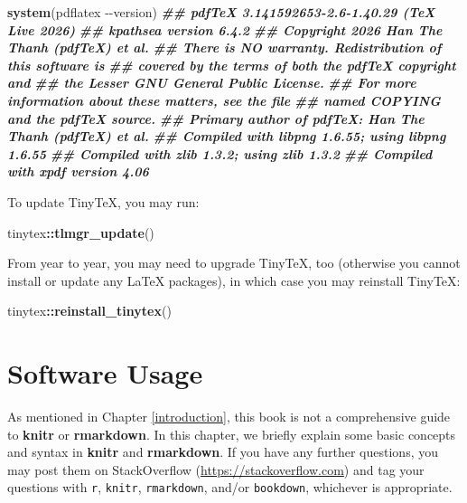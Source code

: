 \documentclass[
  12pt,
]{krantz}
\newenvironment{Shaded}{\begin{snugshade}}{\end{snugshade}}
\newcommand{\DocumentationTok}[1]{\textcolor[rgb]{0.56,0.35,0.01}{\textbf{\textit{#1}}}}
\newcommand{\FunctionTok}[1]{\textcolor[rgb]{0.13,0.29,0.53}{\textbf{#1}}}
\newcommand{\NormalTok}[1]{#1}
\newcommand{\SpecialCharTok}[1]{\textcolor[rgb]{0.81,0.36,0.00}{\textbf{#1}}}
\newcommand{\StringTok}[1]{\textcolor[rgb]{0.31,0.60,0.02}{#1}}
\theoremstyle{definition}
\theoremstyle{definition}
\theoremstyle{definition}
\theoremstyle{definition}
\theoremstyle{remark}
\begin{document}
\begin{Shaded}
\begin{Highlighting}[]
\FunctionTok{system}\NormalTok{(}\StringTok{\textquotesingle{}pdflatex {-}{-}version\textquotesingle{}}\NormalTok{)}
\DocumentationTok{\#\#  pdfTeX 3.141592653{-}2.6{-}1.40.29 (TeX Live 2026)}
\DocumentationTok{\#\#  kpathsea version 6.4.2}
\DocumentationTok{\#\#  Copyright 2026 Han The Thanh (pdfTeX) et al.}
\DocumentationTok{\#\#  There is NO warranty.  Redistribution of this software is}
\DocumentationTok{\#\#  covered by the terms of both the pdfTeX copyright and}
\DocumentationTok{\#\#  the Lesser GNU General Public License.}
\DocumentationTok{\#\#  For more information about these matters, see the file}
\DocumentationTok{\#\#  named COPYING and the pdfTeX source.}
\DocumentationTok{\#\#  Primary author of pdfTeX: Han The Thanh (pdfTeX) et al.}
\DocumentationTok{\#\#  Compiled with libpng 1.6.55; using libpng 1.6.55}
\DocumentationTok{\#\#  Compiled with zlib 1.3.2; using zlib 1.3.2}
\DocumentationTok{\#\#  Compiled with xpdf version 4.06}
\end{Highlighting}
\end{Shaded}

To update TinyTeX, you may run:

\begin{Shaded}
\begin{Highlighting}[]
\NormalTok{tinytex}\SpecialCharTok{::}\FunctionTok{tlmgr\_update}\NormalTok{()}
\end{Highlighting}
\end{Shaded}

From year to year, you may need to upgrade TinyTeX, too (otherwise you cannot install or update any LaTeX packages), in which case you may reinstall TinyTeX:

\begin{Shaded}
\begin{Highlighting}[]
\NormalTok{tinytex}\SpecialCharTok{::}\FunctionTok{reinstall\_tinytex}\NormalTok{()}
\end{Highlighting}
\end{Shaded}

\chapter{Software Usage}\label{software-usage}

As mentioned in Chapter \ref{introduction}, this book is not a comprehensive guide to \textbf{knitr} or \textbf{rmarkdown}. In this chapter, we briefly explain some basic concepts and syntax in \textbf{knitr} and \textbf{rmarkdown}. If you have any further questions, you may post them on StackOverflow (\url{https://stackoverflow.com}) and tag your questions with \texttt{r}, \texttt{knitr}, \texttt{rmarkdown}, and/or \texttt{bookdown}, whichever is appropriate.
\end{document}
